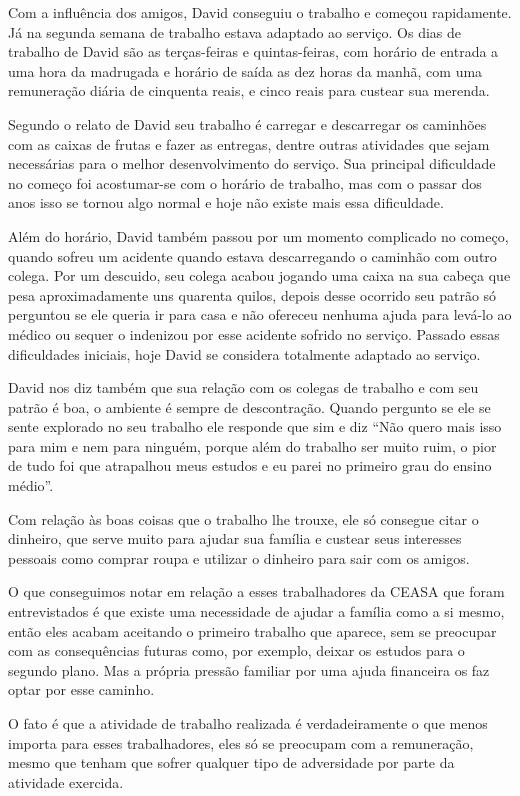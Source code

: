 Com a influência dos amigos, David conseguiu o trabalho e começou rapidamente. Já na segunda semana de trabalho estava adaptado ao serviço. Os dias de trabalho de David são as terças-feiras e quintas-feiras, com horário de entrada a uma hora da madrugada e horário de saída as dez horas da manhã, com uma remuneração diária de cinquenta reais, e cinco reais para custear sua merenda.

Segundo o relato de David seu trabalho é carregar e descarregar os caminhões com as caixas de frutas e fazer as entregas, dentre outras atividades que sejam necessárias para o melhor desenvolvimento do serviço. Sua principal dificuldade no começo foi acostumar-se com o horário de trabalho, mas com o passar dos anos isso se tornou algo normal e hoje não existe mais essa dificuldade.

Além do horário, David também passou por um momento complicado no começo, quando sofreu um acidente quando estava descarregando o caminhão com outro colega. Por um descuido, seu colega acabou jogando uma caixa na sua cabeça que pesa aproximadamente uns quarenta quilos, depois desse ocorrido seu patrão só perguntou se ele queria ir para casa e não ofereceu nenhuma ajuda para levá-lo ao médico ou sequer o indenizou por esse acidente sofrido no serviço. Passado essas dificuldades iniciais, hoje David se considera totalmente adaptado ao serviço.

David nos diz também que sua relação com os colegas de trabalho e com seu patrão é boa, o ambiente é sempre de descontração. Quando pergunto se ele se sente explorado no seu trabalho ele responde que sim e diz ``Não quero mais isso para mim e nem para ninguém, porque além do trabalho ser muito ruim, o pior de tudo foi que atrapalhou meus estudos e eu parei no primeiro grau do ensino médio''.

Com relação às boas coisas que o trabalho lhe trouxe, ele só consegue citar o dinheiro, que serve muito para ajudar sua família e custear seus interesses pessoais como comprar roupa e utilizar o dinheiro para sair com os amigos.

O que conseguimos notar em relação a esses trabalhadores da CEASA que foram entrevistados é que existe uma necessidade de ajudar a família como a si mesmo, então eles acabam aceitando o primeiro trabalho que aparece, sem se preocupar com as consequências futuras como, por exemplo, deixar os estudos para o segundo plano. Mas a própria pressão familiar por uma ajuda financeira os faz optar por esse caminho.

O fato é que a atividade de trabalho realizada é verdadeiramente o que menos importa para esses trabalhadores, eles só se preocupam com a remuneração, mesmo que tenham que sofrer qualquer tipo de adversidade por parte da atividade exercida.

